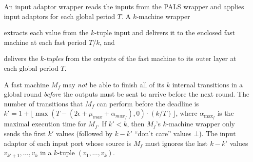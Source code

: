 An input adaptor wrapper reads the inputs from the PALS wrapper
and applies input adaptors %
for each global period $T$. %
A  $k$-machine wrapper
\begin{inparaenum}[(i)]
	\item extracts each value from the $k$-tuple input and delivers it to the enclosed fast machine
at each fast period $T/ k$, and
	\item delivers the $k$-\emph{tuples} from the outputs of the fast machine to its outer layer
	at each global period $T$.
\end{inparaenum}



A fast machine $M_f$ %
may \emph{not} be able to finish 
all of its $k$ internal transitions in a global  round
 \emph{before} the outputs must be sent to arrive before %
the next round.
The number of transitions that $M_f$ can perform before the deadline is 
 $k'= 1+\lfloor \max(T - (2\epsilon + \mu_{max} + \alpha_{max_f}), 0)\cdot (k / T)\rfloor$,
 where  $\alpha_{{\max}_f}$ is the maximal execution time for $M_f$.
If $k' < k$,
then $M_f$'s $k$-machine wrapper only sends the first $k'$ values
(followed by $k - k'$ ``don't care'' values $\bot$).
The input adaptor of each %
input port whose source is $M_f$
must %
ignores the last $k - k'$ values
$v_{k'+1}, \ldots, v_k$ in a $k$-tuple $(v_1, \ldots,  v_k)$.
%


